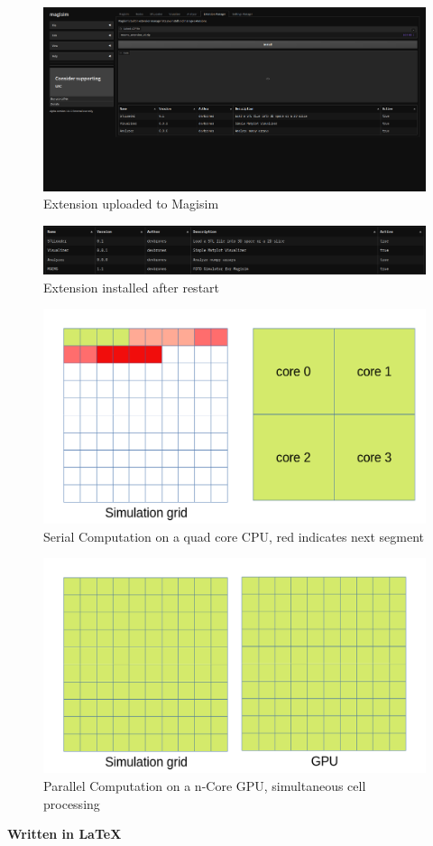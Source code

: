 \documentclass[11pt, a4paper, titlepage]{article}
\begin{document}
\newpage
\begin{figure}[h]
	\includegraphics[width=\textwidth]{magisim-screenshot-0010.png}
	\caption{Extension uploaded to Magisim}
	\label{fig:exuplsucc}
\end{figure}
\begin{figure}[h]
	\includegraphics[width=\textwidth]{magisim-screenshot-0011.png}
	\caption{Extension installed after restart}
	\label{fig:exvisreb}
\end{figure}
\begin{figure}[h]
	\includegraphics[width=\textwidth]{simserial.png}
	\caption{Serial Computation on a quad core CPU, red indicates next segment}
	\label{fig:serialsim}
\end{figure}
\begin{figure}[h]
	\includegraphics[width=\textwidth]{simpar.png}
	\caption{Parallel Computation on a n-Core GPU, simultaneous cell processing}
	\label{fig:parsim}
\end{figure}



\begin{center}
	\large\textbf{Written in \LaTeX}
\end{center}
\end{document}
